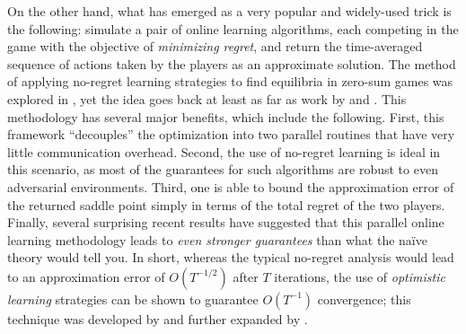 \documentclass[final,12pt]{colt2018} %
\begin{document}
On the other hand, what has emerged as a very popular and widely-used trick is the following: simulate a pair of online learning algorithms, each competing in the game with the objective of \emph{minimizing regret}, and return the time-averaged sequence of actions taken by the players as an approximate solution. The method of applying no-regret learning strategies to find equilibria in zero-sum games was explored in \citet{freund1999adaptive}, yet the idea goes back at least as far as work by \citet{blackwell1956analog} and \citet{hannan1957approximation}. This methodology has several major benefits, which include the following. First, this framework ``decouples'' the optimization into two parallel routines that have very little communication overhead. Second, the use of no-regret learning is ideal in this scenario, as most of the guarantees for such algorithms are robust to even adversarial environments. Third, one is able to bound the approximation error of the returned saddle point simply in terms of the total regret of the two players. Finally, several surprising recent results have suggested that this parallel online learning methodology leads to \emph{even stronger guarantees} than what the na\"{i}ve theory would tell you. In short, whereas the typical no-regret analysis would lead to an approximation error of $O(T^{-1/2})$ after $T$ iterations, the use of \emph{optimistic learning} strategies \citep{CJ12} can be shown to guarantee $O(T^{-1})$ convergence; this technique was developed by \citet{RK13} and further expanded by \citet{SALS15}.
\end{document}
